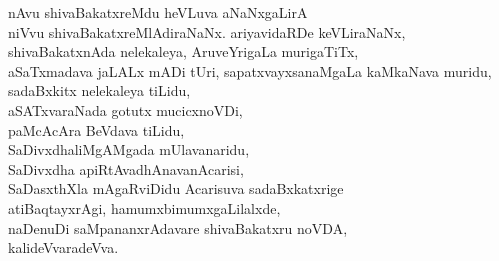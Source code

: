 \begin{entry}
\begin{shl}
nAvu shivaBakatxreMdu heVLuva aNaNxgaLirA\\
niVvu shivaBakatxreMlAdiraNaNx. ariyavidaRDe keVLiraNaNx,\\
shivaBakatxnAda nelekaleya, AruveYrigaLa murigaTiTx,\\
aSaTxmadava jaLALx mADi tUri, sapatxvayxsanaMgaLa kaMkaNava muridu,\\
sadaBxkitx nelekaleya tiLidu,\\
aSATxvaraNada gotutx mucicxnoVDi,\\
paMcAcAra BeVdava tiLidu,\\
SaDivxdhaliMgAMgada mUlavanaridu,\\
SaDivxdha apiRtAvadhAnavanAcarisi,\\
SaDasxthXla mAgaRviDidu Acarisuva sadaBxkatxrige\\
atiBaqtayxrAgi, hamumxbimumxgaLilalxde,\\
naDenuDi saMpananxrAdavare shivaBakatxru noVDA,\\
kalideVvaradeVva.
\end{shl}
\end{entry}

